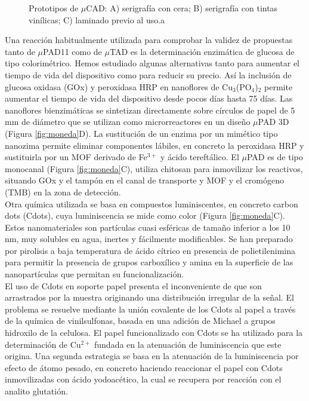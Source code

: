 \documentclass{article}
\begin{document}
\begin{figure}[h]
	\caption{ Prototipos de $\mu$CAD: A) serigrafía con cera; B) serigrafía con tintas vinílicas; C) laminado previo al uso.a}
	\label{fig:tela}
\end{figure}
Una reacción habitualmente utilizada para comprobar la validez de propuestas tanto de $\mu$PAD11 como de $\mu$TAD es la determinación enzimática de glucosa de tipo colorimétrico. Hemos estudiado algunas alternativas tanto para aumentar el tiempo de vida del dispositivo como para reducir su precio. Así la inclusión de glucosa oxidasa (GOx) y peroxidasa HRP en nanoflores de Cu$_{3}$(PO$_{4}$)$_{2}$ permite aumentar el tiempo de vida del dispositivo desde pocos días hasta 75 días. Las nanoflores bienzimáticas se sintetizan directamente sobre círculos de papel de 5 mm de diámetro que se utilizan como microrreactores en un diseño $\mu$PAD 3D (Figura \ref{fig:moneda}D)\cite{Ariza-Avidad2016}. La sustitución de un enzima por un mimético tipo nanozima permite eliminar componentes lábiles, en concreto la peroxidasa HRP y sustituirla por un MOF derivado de Fe$^{3+}$ y ácido tereftálico. El $\mu$PAD es de tipo monocanal (Figura \ref{fig:moneda}C), utiliza chitosan para inmovilizar los reactivos, situando GOx y el tampón en el canal de transporte y MOF y el cromógeno (TMB) en la zona de detección\cite{Ortiz-Gomez2018}.\\

Otra química utilizada se basa en compuestos luminiscentes, en concreto carbon dots (Cdots), cuya luminiscencia se mide como color (Figura \ref{fig:moneda}C). Estos nanomateriales son partículas cuasi esféricas de tamaño inferior a los 10 nm, muy solubles en agua, inertes y fácilmente modificables. Se han preparado por pirolisis a baja temperatura de ácido cítrico en presencia de polietilenimina para permitir la presencia de grupos carboxílico y amina en la superficie de las nanopartículas que permitan su funcionalización\cite{Pedro2014}.\\
 
El uso de Cdots en soporte papel presenta el inconveniente de que son arrastrados por la muestra originando una distribución irregular de la señal. El problema se resuelve mediante la unión covalente de los Cdots al papel a través de la química de vinilsulfonas, basada en una adición de Michael a grupos hidroxilo de la celulosa. El papel funcionalizado con Cdots se ha utilizado para la determinación de Cu$^{2+}$ fundada en la atenuación de luminiscencia que este origina. Una segunda estrategia se basa en la atenuación de la luminiscencia por efecto de átomo pesado, en concreto haciendo reaccionar el papel con Cdots inmovilizadas con ácido yodoacético, la cual se recupera por reacción con el analito glutatión.
\end{document}
